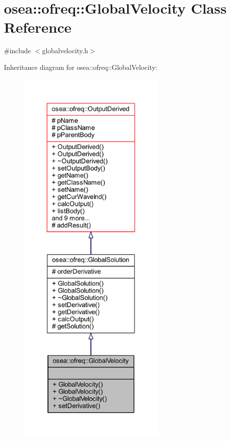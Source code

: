 \hypertarget{classosea_1_1ofreq_1_1_global_velocity}{\section{osea\-:\-:ofreq\-:\-:Global\-Velocity Class Reference}
\label{classosea_1_1ofreq_1_1_global_velocity}
}


{\ttfamily \#include $<$globalvelocity.\-h$>$}



Inheritance diagram for osea\-:\-:ofreq\-:\-:Global\-Velocity\-:
\nopagebreak
\begin{figure}[H]
\begin{center}
\leavevmode
\includegraphics[height=550pt]{classosea_1_1ofreq_1_1_global_velocity__inherit__graph}
\end{center}
\end{figure}
